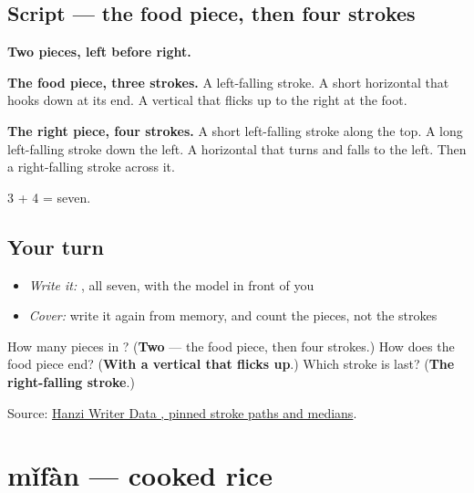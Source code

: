 \subsection*{Script — the food piece, then four strokes}

\begin{quote}
\end{quote}

\textbf{Two pieces, left before right.}

\textbf{The food piece, three strokes.} A left-falling stroke. A short horizontal that hooks down at its end. A vertical that flicks up to the right at the foot.

\textbf{The right piece, four strokes.} A short left-falling stroke along the top. A long left-falling stroke down the left. A horizontal that turns and falls to the left. Then a right-falling stroke across it.

3 + 4 = seven.

\subsection*{Your turn}
\begin{itemize}
\raggedright
  \item \emph{Write it:} , all seven, with the model in front of you
  \item \emph{Cover:} write it again from memory, and count the pieces, not the strokes
\end{itemize}

\begin{tcolorbox}[breakable,colback=teal!4,colframe=teal!35!black,title={Before you move on}]
How many pieces in ? (\textbf{Two} — the food piece, then four strokes.) How does the food piece end? (\textbf{With a vertical that flicks up}.) Which stroke is last? (\textbf{The right-falling stroke}.)

Source: \href{https://raw.githubusercontent.com/chanind/hanzi-writer-data/68d10a4b21150cae5e1ebbd223eed289cf32d90c/data/\%E9\%A5\%AD.json}{Hanzi Writer Data , pinned stroke paths and medians}.
\end{tcolorbox}
\section[mǐfàn]{mǐfàn — cooked rice}

\label{lesson:ZH-C38-mifan}



